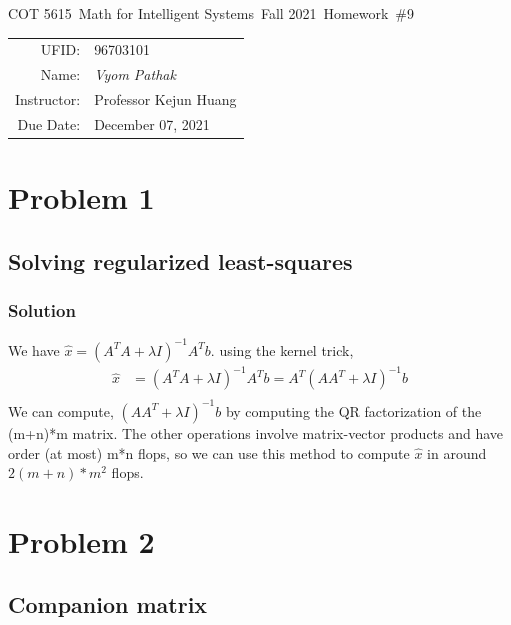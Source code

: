 \documentclass{article}
\newcommand{\hmwkTitle}{Homework\ \#9}
\newcommand{\hmwkDueDate}{December 07, 2021}
\newcommand{\hmwkClassCode}{COT 5615}
\newcommand{\hmwkClass}{Math for Intelligent Systems}
\newcommand{\hmwkClassYear}{Fall 2021}
\newcommand{\hmwkClassInstructor}{Professor Kejun Huang}
\newcommand{\hmwkAuthorName}{\textit{Vyom Pathak}}
\newcommand{\hmwkUFID}{96703101}
\begin{document}
\begin{center}
{\Large \hmwkClassCode\ \hmwkClass\ \hmwkClassYear\ \hmwkTitle}

\begin{tabular}{rl}
UFID: & \hmwkUFID \\
Name: & \hmwkAuthorName \\
Instructor: & \hmwkClassInstructor \\
Due Date: & \hmwkDueDate \\ 
\end{tabular}
\end{center}

\section*{Problem 1}
\subsection*{Solving regularized least-squares}
\subsubsection*{Solution}
We have $\hat{x} = (A^TA + \lambda I)^{-1}A^Tb$.
using the kernel trick, 
\begin{align*}
    \hat{x} & = (A^TA + \lambda I)^{-1}A^Tb = A^T(AA^T+\lambda I)^{-1}b\\
\end{align*}
We can compute, $(AA^T+\lambda I)^{-1}b$ by computing the QR factorization of the (m+n)*m matrix. The other operations involve matrix-vector products and have order (at most) m*n flops, so we can use this method to compute $\hat{x}$ in around $2(m + n)*m^2$ flops. 
\section*{Problem 2}
\subsection*{Companion matrix}
\end{document}
